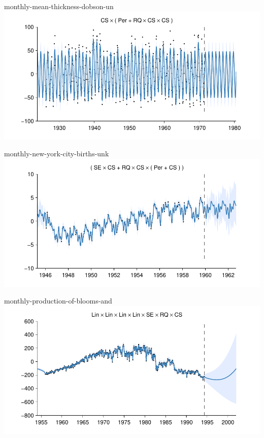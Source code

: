     
\begin{frame}{monthly-mean-thickness-dobson-un}
  \center
  \includegraphics[width=1.0\textwidth]{figures/monthly-mean-thickness-dobson-un/monthly-mean-thickness-dobson-un_all}
\end{frame}  


    
\begin{frame}{monthly-new-york-city-births-unk}
  \center
  \includegraphics[width=1.0\textwidth]{figures/monthly-new-york-city-births-unk/monthly-new-york-city-births-unk_all}
\end{frame}  


    
\begin{frame}{monthly-production-of-blooms-and}
  \center
  \includegraphics[width=1.0\textwidth]{figures/monthly-production-of-blooms-and/monthly-production-of-blooms-and_all}
\end{frame}  


